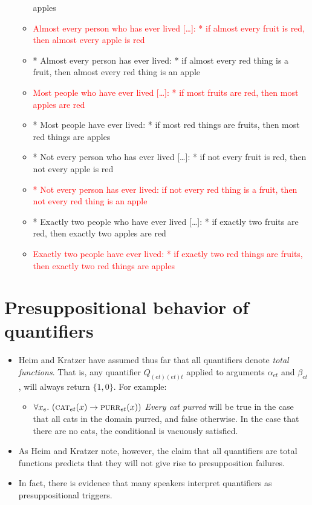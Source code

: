 \documentclass[a4paper]{article}
\begin{document}
\begin{itemize}
\begin{itemize}
    apples
  \item \textcolor{red}{Almost every person who has ever lived [\ldots]: * if almost every fruit is red, then
      almost every apple is red}
  \item * Almost every person has ever lived: * if almost every red thing is a fruit, then almost
    every red thing is an apple
  \item \textcolor{red}{Most people who have ever lived [\ldots]: * if most fruits are red, then most apples are red}
  \item * Most people have ever lived: * if most red things are fruits, then most red things are
    apples
  \item * Not every person who has ever lived [\ldots]: * if not every fruit is red, then not every apple is red
  \item \textcolor{red}{* Not every person has ever lived: if not every red thing is a fruit, then not every
      red thing is an apple}
  \item * Exactly two people who have ever lived [\ldots]: * if exactly two fruits are red, then exactly two
    apples are red
  \item \textcolor{red}{Exactly two people have ever lived: * if exactly two red things are fruits, then exactly two red
    things are apples}
  \end{itemize}
\end{itemize}


\section{Presuppositional behavior of quantifiers}
\begin{itemize}
\item Heim and Kratzer have assumed thus far that all quantifiers denote \emph{total functions}. That is, any quantifier $Q_{(et)(et)t}$ applied to arguments $\alpha_{et}$ and $\beta_{et}$, will always return $\lbrace1, 0\rbrace$. For example:
\begin{itemize}
\item $\forall x_e.\ (\textsc{cat}_{et}(x) -> \textsc{purr}_{et}(x))$ \emph{Every cat purred} will be true in the case that all cats in the domain purred, and false otherwise. In the case that there are no cats, the conditional is vacuously satisfied.
\end{itemize}
\item As Heim and Kratzer note, however, the claim that all quantifiers are total functions predicts that they will not give rise to presupposition failures.
\item In fact, there is evidence that many speakers interpret quantifiers as presuppositional triggers.
\end{itemize}
\end{document}
